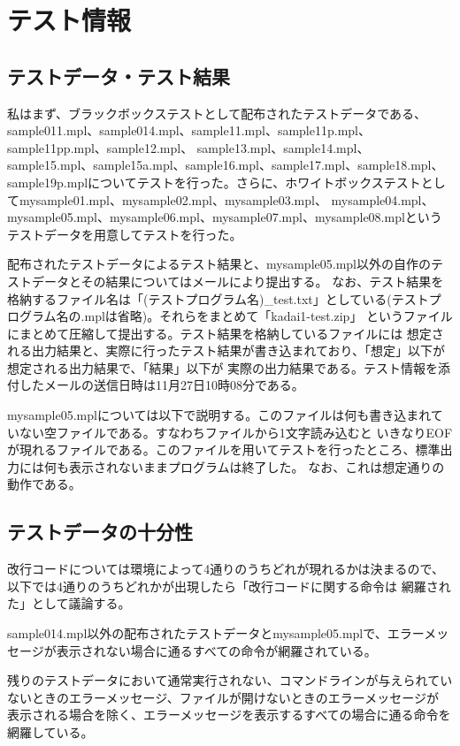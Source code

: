 \documentclass{jarticle}
\begin{document}
\section{テスト情報}
\subsection{テストデータ・テスト結果}
私はまず、ブラックボックステストとして配布されたテストデータである、sample011.mpl、sample014.mpl、sample11.mpl、sample11p.mpl、sample11pp.mpl、sample12.mpl、
sample13.mpl、sample14.mpl、sample15.mpl、sample15a.mpl、sample16.mpl、sample17.mpl、sample18.mpl、
sample19p.mplについてテストを行った。さらに、ホワイトボックステストとしてmysample01.mpl、mysample02.mpl、mysample03.mpl、
mysample04.mpl、mysample05.mpl、mysample06.mpl、mysample07.mpl、mysample08.mplというテストデータを用意してテストを行った。

配布されたテストデータによるテスト結果と、mysample05.mpl以外の自作のテストデータとその結果についてはメールにより提出する。
なお、テスト結果を格納するファイル名は「(テストプログラム名)\_test.txt」としている(テストプログラム名の.mplは省略)。それらをまとめて「kadai1-test.zip」
というファイルにまとめて圧縮して提出する。テスト結果を格納しているファイルには
想定される出力結果と、実際に行ったテスト結果が書き込まれており、「想定」以下が想定される出力結果で、「結果」以下が
実際の出力結果である。テスト情報を添付したメールの送信日時は11月27日10時08分である。

mysample05.mplについては以下で説明する。このファイルは何も書き込まれていない空ファイルである。すなわちファイルから1文字読み込むと
いきなりEOFが現れるファイルである。このファイルを用いてテストを行ったところ、標準出力には何も表示されないままプログラムは終了した。
なお、これは想定通りの動作である。
\subsection{テストデータの十分性}
改行コードについては環境によって4通りのうちどれが現れるかは決まるので、以下では4通りのうちどれかが出現したら「改行コードに関する命令は
網羅された」として議論する。

sample014.mpl以外の配布されたテストデータとmysample05.mplで、エラーメッセージが表示されない場合に通るすべての命令が網羅されている。

残りのテストデータにおいて通常実行されない、コマンドラインが与えられていないときのエラーメッセージ、ファイルが開けないときのエラーメッセージが
表示される場合を除く、エラーメッセージを表示するすべての場合に通る命令を網羅している。
\end{document}
